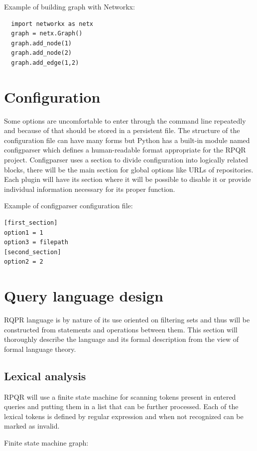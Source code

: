 Example of building graph with Networkx:
\begin{lstlisting}
  import networkx as netx
  graph = netx.Graph()
  graph.add_node(1)
  graph.add_node(2)
  graph.add_edge(1,2)
\end{lstlisting}

\section*{Configuration}
Some options are uncomfortable to enter through the command line repeatedly and because of that should
be stored in a persistent file. The structure of the configuration file can have many forms but Python has
a built-in module named configparser which defines a human-readable format appropriate for the RPQR project.
Configparser uses a section to divide configuration into logically related blocks, there will be
the main section for global options like URLs of repositories. Each plugin will have its section
where it will be possible to disable it or provide individual information necessary for its proper
function.

Example of configparser configuration file:
\begin{lstlisting}
[first_section]
option1 = 1
option3 = filepath
[second_section]
option2 = 2
\end{lstlisting}

\newpage

\section{Query language design}
RQPR language is by nature of its use oriented on filtering sets and thus will be constructed from
statements and operations between them. This section will thoroughly describe the language and
its formal description from the view of formal language theory.

\subsection*{Lexical analysis}
RPQR will use a finite state machine for scanning tokens present in entered queries and putting them
in a list that can be further processed. Each of the lexical tokens is defined by regular expression
and when not recognized can be marked as invalid.

Finite state machine graph:

